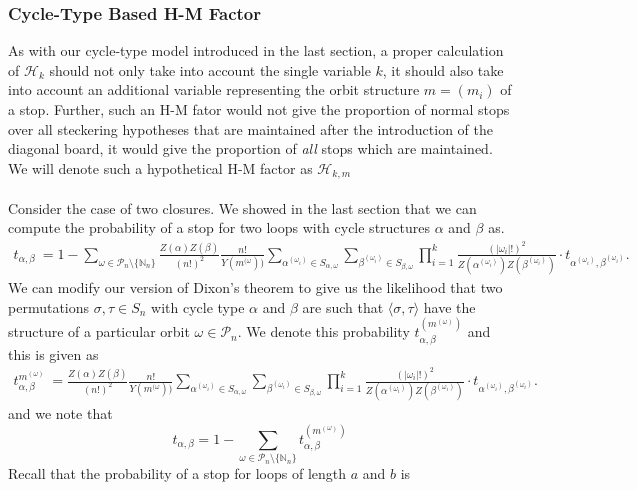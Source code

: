 \subsubsection{Cycle-Type Based H-M Factor}
As with our cycle-type model introduced in the last section, a proper calculation of $\mathcal{H}_k$ should not only take into account the single variable $k$, it should also take into account an additional variable representing the orbit structure $m = (m_i)$ of a stop. Further, such an H-M fator would not give the proportion of normal stops over all steckering hypotheses that are maintained after the introduction of the diagonal board, it would give the proportion of \emph{all} stops which are maintained. We will denote such a hypothetical H-M factor as $\mathcal{H}_{k,m}$  
\\\\Consider the case of two closures. We showed in the last section that we can compute the probability of a stop for two loops with cycle structures $\alpha$ and $\beta$ as.
\begin{align*}
    t_{\alpha, \beta}\ = 1 - \sum_{\omega\in\mathcal{P}_n \setminus\{\mathbb{N}_n\}}\frac{Z(\alpha)Z(\beta)}{(n!)^2}\frac{n!}{Y(m^{(\omega}))}\sum_{\alpha^{(\omega_i)}\in S_{\alpha,\omega}}\sum_{\beta^{(\omega_i)}\in S_{\beta,\omega}}\prod_{i=1}^k
{\frac{(|\omega_i|!)^2}{Z(\alpha^{(\omega_i)})Z(\beta^{(\omega_i)})}}\cdot t_{\alpha^{(\omega_i)},\beta^{(\omega_i)}}.
\end{align*}
We can modify our version of Dixon's theorem to give us the likelihood that two permutations $\sigma,\tau\in S_n$ with cycle type $\alpha$ and $\beta$ are such that $\langle\sigma,\tau\rangle$ have the structure of a particular orbit $\omega\in\mathcal{P}_n$. We denote this probability $t_{\alpha,\beta}^{(m^{(\omega)})}$ and this is given as 
\begin{align*}
    t^{m^{(\omega)}}_{\alpha, \beta}\ =\frac{Z(\alpha)Z(\beta)}{(n!)^2}\frac{n!}{Y(m^{(\omega}))}\sum_{\alpha^{(\omega_i)}\in S_{\alpha,\omega}}\sum_{\beta^{(\omega_i)}\in S_{\beta,\omega}}\prod_{i=1}^k
{\frac{(|\omega_i|!)^2}{Z(\alpha^{(\omega_i)})Z(\beta^{(\omega_i)})}}\cdot t_{\alpha^{(\omega_i)},\beta^{(\omega_i)}}.
\end{align*}
and we note that 
\[
t_{\alpha,\beta} = 1 - \sum_{\omega\in\mathcal{P}_n\setminus\{\mathbb{N}_n\}}t_{\alpha,\beta}^{(m^{(\omega)})}
\]
Recall that the probability of a stop for loops of length $a$ and $b$ is 

